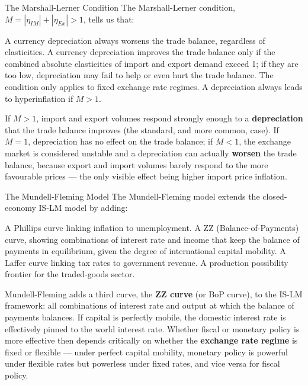 \begin{question}[type=mc]{The Marshall-Lerner Condition}
The Marshall-Lerner condition, $M = |\eta_{IM}| + |\eta_{Ex}| > 1$, tells us
that:
\begin{choices}
  \choice        A currency depreciation always worsens the trade balance,
                 regardless of elasticities.
  \correctchoice A currency depreciation improves the trade balance only if
                 the combined absolute elasticities of import and export
                 demand exceed 1; if they are too low, depreciation may fail
                 to help or even hurt the trade balance.
  \choice        The condition only applies to fixed exchange rate regimes.
  \choice        A depreciation always leads to hyperinflation if $M > 1$.
\end{choices}
\begin{solution}
  If $M > 1$, import and export volumes respond strongly enough to a
  \textbf{depreciation} that the trade balance improves (the standard, and
  more common, case). If $M = 1$, depreciation has no effect on the trade
  balance; if $M < 1$, the exchange market is considered unstable and a
  depreciation can actually \textbf{worsen} the trade balance, because
  export and import volumes barely respond to the more favourable prices ---
  the only visible effect being higher import price inflation.
\end{solution}
\end{question}

\begin{question}[type=mc]{The Mundell-Fleming Model}
The Mundell-Fleming model extends the closed-economy IS-LM model by adding:
\begin{choices}
  \choice        A Phillips curve linking inflation to unemployment.
  \correctchoice A ZZ (Balance-of-Payments) curve, showing combinations of
                 interest rate and income that keep the balance of payments
                 in equilibrium, given the degree of international capital
                 mobility.
  \choice        A Laffer curve linking tax rates to government revenue.
  \choice        A production possibility frontier for the traded-goods
                 sector.
\end{choices}
\begin{solution}
  Mundell-Fleming adds a third curve, the \textbf{ZZ curve} (or BoP curve),
  to the IS-LM framework: all combinations of interest rate and output at
  which the balance of payments balances. If capital is perfectly mobile,
  the domestic interest rate is effectively pinned to the world interest
  rate. Whether fiscal or monetary policy is more effective then depends
  critically on whether the \textbf{exchange rate regime} is fixed or
  flexible --- under perfect capital mobility, monetary policy is powerful
  under flexible rates but powerless under fixed rates, and vice versa for
  fiscal policy.
\end{solution}
\end{question}


